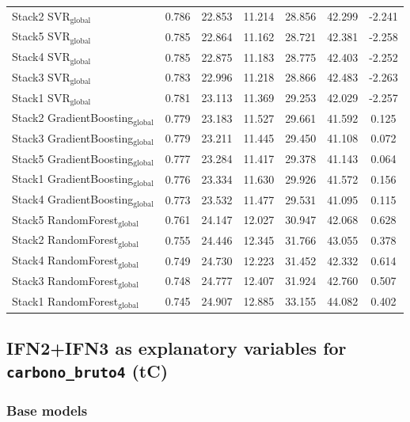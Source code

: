 \begin{table}[tp]
{\begin{tabular}{p{4.5cm}cccccc}
    Stack2 SVR$_{\text{global}}$ & 0.786 & 22.853 & 11.214 & 28.856 & 42.299 & -2.241 \\
    Stack5 SVR$_{\text{global}}$ & 0.785 & 22.864 & 11.162 & 28.721 & 42.381 & -2.258 \\
    Stack4 SVR$_{\text{global}}$ & 0.785 & 22.875 & 11.183 & 28.775 & 42.403 & -2.252 \\
    Stack3 SVR$_{\text{global}}$ & 0.783 & 22.996 & 11.218 & 28.866 & 42.483 & -2.263 \\
    Stack1 SVR$_{\text{global}}$ & 0.781 & 23.113 & 11.369 & 29.253 & 42.029 & -2.257 \\
    Stack2 GradientBoosting$_{\text{global}}$ & 0.779 & 23.183 & 11.527 & 29.661 & 41.592 & 0.125 \\
    Stack3 GradientBoosting$_{\text{global}}$ & 0.779 & 23.211 & 11.445 & 29.450 & 41.108 & 0.072 \\
    Stack5 GradientBoosting$_{\text{global}}$ & 0.777 & 23.284 & 11.417 & 29.378 & 41.143 & 0.064 \\
    Stack1 GradientBoosting$_{\text{global}}$ & 0.776 & 23.334 & 11.630 & 29.926 & 41.572 & 0.156 \\
    Stack4 GradientBoosting$_{\text{global}}$ & 0.773 & 23.532 & 11.477 & 29.531 & 41.095 & 0.115 \\
    Stack5 RandomForest$_{\text{global}}$ & 0.761 & 24.147 & 12.027 & 30.947 & 42.068 & 0.628 \\
    Stack2 RandomForest$_{\text{global}}$ & 0.755 & 24.446 & 12.345 & 31.766 & 43.055 & 0.378 \\
    Stack4 RandomForest$_{\text{global}}$ & 0.749 & 24.730 & 12.223 & 31.452 & 42.332 & 0.614 \\
    Stack3 RandomForest$_{\text{global}}$ & 0.748 & 24.777 & 12.407 & 31.924 & 42.760 & 0.507 \\
    Stack1 RandomForest$_{\text{global}}$ & 0.745 & 24.907 & 12.885 & 33.155 & 44.082 & 0.402 \\
            \bottomrule
    \end{tabular}
    }
\end{table}


\clearpage
\subsection{IFN2+IFN3 as explanatory variables for \texttt{carbono\_bruto4} (tC)}

\subsubsection{Base models}

